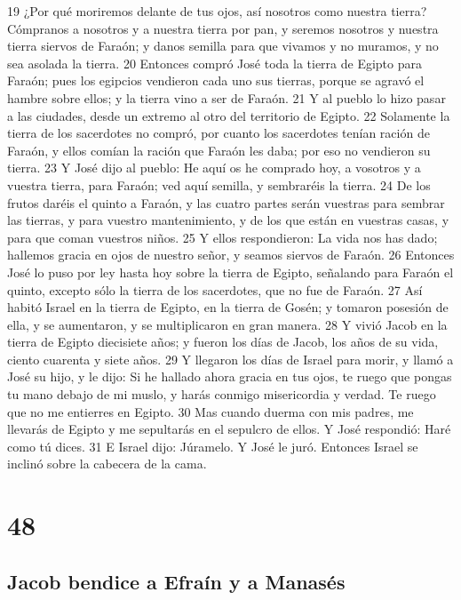 19 ¿Por qué moriremos delante de tus ojos, así nosotros como nuestra tierra? Cómpranos a nosotros y a nuestra tierra por pan, y seremos nosotros y nuestra tierra siervos de Faraón; y danos semilla para que vivamos y no muramos, y no sea asolada la tierra.
20 Entonces compró José toda la tierra de Egipto para Faraón; pues los egipcios vendieron cada uno sus tierras, porque se agravó el hambre sobre ellos; y la tierra vino a ser de Faraón.
21 Y al pueblo lo hizo pasar a las ciudades, desde un extremo al otro del territorio de Egipto.
22 Solamente la tierra de los sacerdotes no compró, por cuanto los sacerdotes tenían ración de Faraón, y ellos comían la ración que Faraón les daba; por eso no vendieron su tierra.
23 Y José dijo al pueblo: He aquí os he comprado hoy, a vosotros y a vuestra tierra, para Faraón; ved aquí semilla, y sembraréis la tierra.
24 De los frutos daréis el quinto a Faraón, y las cuatro partes serán vuestras para sembrar las tierras, y para vuestro mantenimiento, y de los que están en vuestras casas, y para que coman vuestros niños.
25 Y ellos respondieron: La vida nos has dado; hallemos gracia en ojos de nuestro señor, y seamos siervos de Faraón.
26 Entonces José lo puso por ley hasta hoy sobre la tierra de Egipto, señalando para Faraón el quinto, excepto sólo la tierra de los sacerdotes, que no fue de Faraón.
27 Así habitó Israel en la tierra de Egipto, en la tierra de Gosén; y tomaron posesión de ella, y se aumentaron, y se multiplicaron en gran manera.
28 Y vivió Jacob en la tierra de Egipto diecisiete años; y fueron los días de Jacob, los años de su vida, ciento cuarenta y siete años.
29 Y llegaron los días de Israel para morir, y llamó a José su hijo, y le dijo: Si he hallado ahora gracia en tus ojos, te ruego que pongas tu mano debajo de mi muslo, y harás conmigo misericordia y verdad. Te ruego que no me entierres en Egipto.
30 Mas cuando duerma con mis padres, me llevarás de Egipto y me sepultarás en el sepulcro de ellos. Y José respondió: Haré como tú dices.
31 E Israel dijo: Júramelo. Y José le juró. Entonces Israel se inclinó sobre la cabecera de la cama.

\chapter{48}

\section{Jacob bendice a Efraín y a Manasés}

